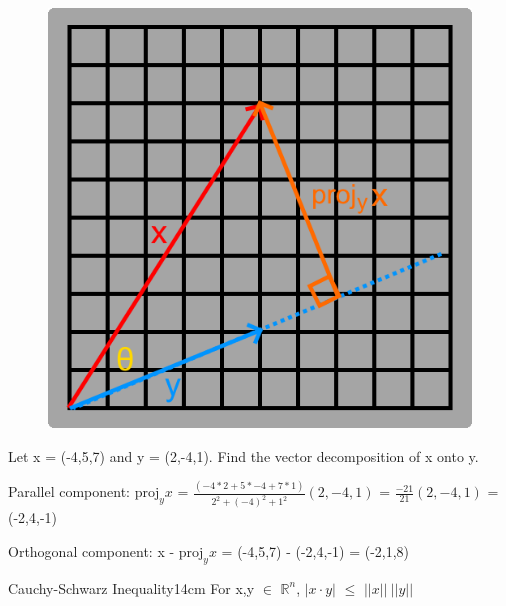     \begin{figure}[h]
        \centering
        \includegraphics[scale=0.4]{Images/1.1.7.png}
    \end{figure}

    \vspace{0.5cm}



    \begin{example}
        Let x = (-4,5,7) and y = (2,-4,1). Find the vector decomposition
        of x onto y.
    \end{example}

    \begin{tbox}
        Parallel component:
        \hspace{0.5cm}
        $\text{proj}_yx$
        = $\frac{(-4*2 + 5*-4 + 7*1)}{2^2 + (-4)^2 + 1^2}(2,-4,1)$
        = $\frac{-21}{21}(2,-4,1)$ = (-2,4,-1)

        Orthogonal component:
        \hspace{0.5cm}
        x - $\text{proj}_yx$
        = (-4,5,7) - (-2,4,-1)
        = (-2,1,8)
    \end{tbox}

    \vspace{0.5cm}



    \begin{wtheorem}{Cauchy-Schwarz Inequality}{14cm}
        For x,y $\in$ $\mathbb{R}^n$,
        $|x \cdot y|$ $\leq$ $||x|| \ ||y||$
    \end{wtheorem}

